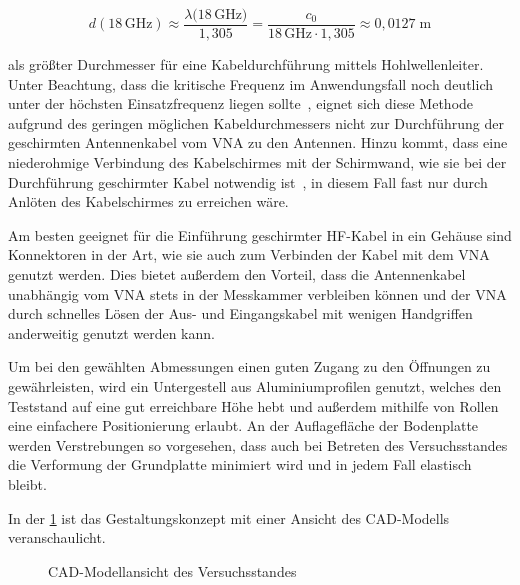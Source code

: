 \begin{equation}
    d(18\,\si{\giga\hertz}) \approx \frac{\lambda(18\,\si{\giga\hertz)}}{1,305} = \frac{c_0}{18\,\si{\giga\hertz}\cdot 1,305} \approx 0,0127 \; \si{\meter}
\end{equation}

als größter Durchmesser für eine Kabeldurchführung mittels Hohlwellenleiter. Unter Beachtung, dass die kritische Frequenz im Anwendungsfall noch deutlich unter der höchsten Einsatzfrequenz liegen sollte~\cite{EM_Schirmung}, eignet sich diese Methode aufgrund des geringen möglichen Kabeldurchmessers nicht zur Durchführung der geschirmten Antennenkabel vom \ac{VNA} zu den Antennen. Hinzu kommt, dass eine niederohmige Verbindung des Kabelschirmes mit der Schirmwand, wie sie bei der Durchführung geschirmter Kabel notwendig ist~\cite{EM_Schirmung, EMV}, in diesem Fall fast nur durch Anlöten des Kabelschirmes zu erreichen wäre.
\par
\vspace{\linespace}
Am besten geeignet für die Einführung geschirmter HF-Kabel in ein Gehäuse sind Konnektoren in der Art, wie sie auch zum Verbinden der Kabel mit dem \ac{VNA} genutzt werden. Dies bietet außerdem den Vorteil, dass die Antennenkabel unabhängig vom \ac{VNA} stets in der Messkammer verbleiben können und der \ac{VNA} durch schnelles Lösen der Aus- und Eingangskabel mit wenigen Handgriffen anderweitig genutzt werden kann. 
\par
\vspace{\linespace}
Um bei den gewählten Abmessungen einen guten Zugang zu den Öffnungen zu gewährleisten, wird ein Untergestell aus Aluminiumprofilen genutzt, welches den Teststand auf eine gut erreichbare Höhe hebt und außerdem mithilfe von Rollen eine einfachere Positionierung erlaubt. An der Auflagefläche der Bodenplatte werden Verstrebungen so vorgesehen, dass auch bei Betreten des Versuchsstandes die Verformung der Grundplatte minimiert wird und in jedem Fall elastisch bleibt.
\par
\vspace{\linespace}
In der \Abb\ref{fig:3_Entwurf_CAD} ist das Gestaltungskonzept mit einer Ansicht des CAD-Modells veranschaulicht. 


\begin{figure}
    \centering
    \caption{CAD-Modellansicht des Versuchsstandes}
    \label{fig:3_Entwurf_CAD}
\end{figure}
















